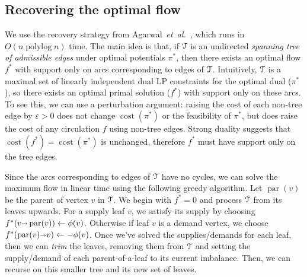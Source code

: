\documentclass[a4paper,UKenglish]{socg-lipics-v2018}
\def\etal{\emph{et~al.}}
\def\etal{\textit{et~al.}}
\def\polylog{\mathop{\mathrm{polylog}}}
\def\eps{\varepsilon}
\def\fsupply{\phi}
\def\arcto{\mathord\shortrightarrow}
\def\arc#1#2{#1\arcto#2}
\def\cost{\operatorname{cost}}
\def\parent{\operatorname{par}}
\theoremstyle{plain}
\numberwithin{figure}{section}
\def\EMPH#1{\textcolor{BrickRed}{{\emph{#1}}}}
\begin{document}
\begin{toappendix}

\subsection{Recovering the optimal flow}
\label{SSA:flow-recovery}

We use the recovery strategy from Agarwal~\etal~\cite{AFPVX17}, which runs in
$O(n\polylog n)$ time.
The main idea is that, if $\EuScript{T}$ is an undirected \emph{spanning tree of admissible edges}
under optimal potentials $\pi^*$, then there exists an optimal flow $f^*$ with
support only on arcs corresponding to edges of $\EuScript{T}$.
Intuitively, $\EuScript{T}$ is a maximal set of linearly independent dual LP
constraints for the optimal dual ($\pi^*$), so there exists an optimal primal
solution ($f^*$) with support only on these arcs.
To see this, we can use a perturbation argument: raising the cost of each
non-tree edge by $\eps > 0$ does not change $\cost(\pi^*)$ or the feasibility
of $\pi^*$, but does raise the cost of any circulation $f$ using non-tree edges.
Strong duality suggests that $\cost(f^*) = \cost(\pi^*)$ is unchanged,
therefore $f^*$ must have support only on the tree edges.

Since the arcs corresponding to edges of $\EuScript{T}$ have no cycles, we can
solve the maximum flow in linear time using the following greedy algorithm.
Let $\parent(v)$ be the parent of vertex $v$ in $\EuScript{T}$.
We begin with $f^* = 0$ and process $\EuScript{T}$ from its leaves upwards.
For a supply leaf $v$, we satisfy its supply by choosing
$f^*(\arc{v}{\parent(v)}) \gets \fsupply(v)$.
Otherwise if leaf $v$ is a demand vertex, we choose
$f^*(\arc{\parent(v)}{v}) \gets -\fsupply(v)$.
Once we've solved the supplies/demands for each leaf, then we can \EMPH{trim}
the leaves, removing them from $\EuScript{T}$ and setting the supply/demand
of each parent-of-a-leaf to its current imbalance.
Then, we can recurse on this smaller tree and its new set of leaves.


\end{toappendix}
\end{document}
